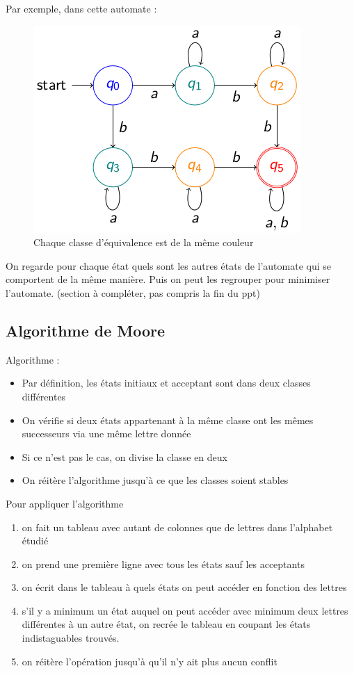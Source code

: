 \documentclass{article}
\begin{document}
Par exemple, dans cette automate :
\begin{figure}[h]
	\centering
	\includegraphics[scale=0.3]{indistagable.png}
	\caption{Chaque classe d'équivalence est de la même couleur}
\end{figure}

On regarde pour chaque état quels sont les autres états de l'automate qui se comportent de la même manière. Puis on peut les regrouper pour minimiser l'automate.
(section à compléter, pas compris la fin du ppt)

\subsection{Algorithme de Moore}
Algorithme :
\begin{itemize}
	\item Par définition, les états initiaux et acceptant sont dans deux classes différentes
	\item On vérifie si deux états appartenant à la même classe ont les mêmes successeurs via une même lettre donnée
	\item Si ce n'est pas le cas, on divise la classe en deux
	\item On réitère l'algorithme jusqu'à ce que les classes soient stables
\end{itemize}

Pour appliquer l'algorithme
\begin{enumerate}
	\item on fait un tableau avec autant de colonnes que de lettres dans l'alphabet étudié
	\item on prend une première ligne avec tous les états sauf les acceptants
	\item on écrit dans le tableau à quels états on peut accéder en fonction des lettres
	\item s'il y a minimum un état auquel on peut accéder avec minimum deux lettres différentes à un autre état, on recrée le tableau en coupant les états indistaguables trouvés.
	\item on réitère l'opération jusqu'à qu'il n'y ait plus aucun conflit
\end{enumerate}
\end{document}
